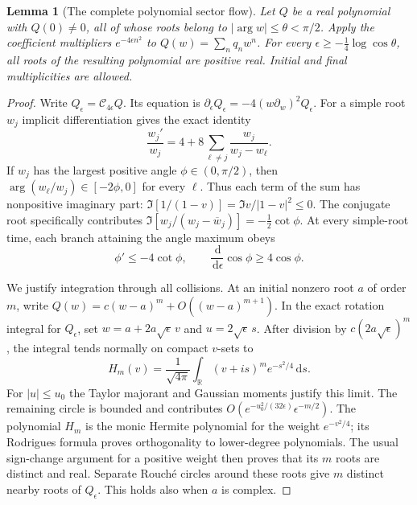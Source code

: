 \documentclass[11pt]{article}
\newtheorem{lemma}[theorem]{Lemma}
\theoremstyle{remark}\newtheorem{remark}[theorem]{Remark}
\newcommand{\R}{\mathbb R}
\newcommand{\dd}{\,\mathrm d}
\begin{document}
\begin{lemma}[The complete polynomial sector flow]
\label{lem:euler-sector-flow}
Let $Q$ be a real polynomial with $Q(0)\ne0$, all of whose roots
belong to $|\arg w|\le\theta<\pi/2$. Apply the coefficient multipliers
$e^{-4\epsilon n^2}$ to $Q(w)=\sum_nq_nw^n$.
For every $\epsilon\ge-\frac14\log\cos\theta$, all roots of
the resulting polynomial are positive real. Initial and final
multiplicities are allowed.
\end{lemma}
\begin{proof}
Write $Q_\epsilon=\mathcal C_{4\epsilon}Q$.
Its equation is
$\partial_\epsilon Q_\epsilon=-4(w\partial_w)^2Q_\epsilon$.
For a simple root $w_j$ implicit differentiation gives the exact identity
\[
 \frac{w_j'}{w_j}
     =4+8\sum_{\ell\ne j}\frac{w_j}{w_j-w_\ell}.           \tag{EUL6}
\]
If $w_j$ has the largest positive angle $\phi\in(0,\pi/2)$,
then $\arg(w_\ell/w_j)\in[-2\phi,0]$ for every $\ell$.
Thus each term of the sum has nonpositive imaginary part:
$\Im[1/(1-v)]=\Im v/|1-v|^2\le0$.
The conjugate root specifically contributes
$\Im[w_j/(w_j-\overline w_j)]=-\tfrac12\cot\phi$.
At every simple-root time, each branch attaining the angle maximum obeys
\[
       \phi'\le-4\cot\phi,\qquad
       \frac{\dd}{\dd\epsilon}\cos\phi\ge4\cos\phi.        \tag{EUL7}
\]

We justify integration through all collisions.
At an initial nonzero root $a$ of order $m$, write
$Q(w)=c(w-a)^m+O((w-a)^{m+1})$.
In the exact rotation integral for $Q_\epsilon$, set
$w=a+2a\sqrt\epsilon\,v$ and $u=2\sqrt\epsilon\,s$.
After division by $c(2a\sqrt\epsilon)^m$, the integral tends
normally on compact $v$-sets to
\[
 H_m(v)=\frac1{\sqrt{4\pi}}\int_{\R}(v+is)^me^{-s^2/4}\dd s.
                                                               \tag{EUL8}
\]
For $|u|\le u_0$ the Taylor majorant and Gaussian moments
justify this limit. The remaining circle is bounded and contributes
$O(e^{-u_0^2/(32\epsilon)}\epsilon^{-m/2})$.
The polynomial $H_m$ is the monic Hermite polynomial for
the weight $e^{-v^2/4}$; its Rodrigues formula proves orthogonality
to lower-degree polynomials. The usual sign-change argument for
a positive weight then proves that its $m$ roots are distinct and real.
Separate Rouch\'e circles around these roots give $m$ distinct
nearby roots of $Q_\epsilon$. This holds also when $a$ is complex.


\end{proof}
\end{document}
